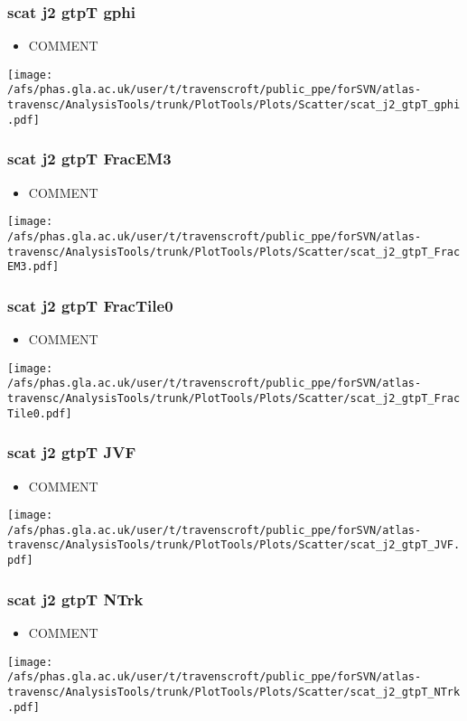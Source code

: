 \documentclass{beamer}
\begin{document}
\begin{frame}
\frametitle{scat j2 gtpT gphi}
\begin{itemize}
\item COMMENT
\end{itemize}
\begin{center}
\texttt{[image: /afs/phas.gla.ac.uk/user/t/travenscroft/public\_ppe/forSVN/atlas-travensc/AnalysisTools/trunk/PlotTools/Plots/Scatter/scat\_j2\_gtpT\_gphi.pdf]}
\end{center}
\end{frame}

\begin{frame}
\frametitle{scat j2 gtpT FracEM3}
\begin{itemize}
\item COMMENT
\end{itemize}
\begin{center}
\texttt{[image: /afs/phas.gla.ac.uk/user/t/travenscroft/public\_ppe/forSVN/atlas-travensc/AnalysisTools/trunk/PlotTools/Plots/Scatter/scat\_j2\_gtpT\_FracEM3.pdf]}
\end{center}
\end{frame}

\begin{frame}
\frametitle{scat j2 gtpT FracTile0}
\begin{itemize}
\item COMMENT
\end{itemize}
\begin{center}
\texttt{[image: /afs/phas.gla.ac.uk/user/t/travenscroft/public\_ppe/forSVN/atlas-travensc/AnalysisTools/trunk/PlotTools/Plots/Scatter/scat\_j2\_gtpT\_FracTile0.pdf]}
\end{center}
\end{frame}

\begin{frame}
\frametitle{scat j2 gtpT JVF}
\begin{itemize}
\item COMMENT
\end{itemize}
\begin{center}
\texttt{[image: /afs/phas.gla.ac.uk/user/t/travenscroft/public\_ppe/forSVN/atlas-travensc/AnalysisTools/trunk/PlotTools/Plots/Scatter/scat\_j2\_gtpT\_JVF.pdf]}
\end{center}
\end{frame}

\begin{frame}
\frametitle{scat j2 gtpT NTrk}
\begin{itemize}
\item COMMENT
\end{itemize}
\begin{center}
\texttt{[image: /afs/phas.gla.ac.uk/user/t/travenscroft/public\_ppe/forSVN/atlas-travensc/AnalysisTools/trunk/PlotTools/Plots/Scatter/scat\_j2\_gtpT\_NTrk.pdf]}
\end{center}
\end{frame}
\end{document}
